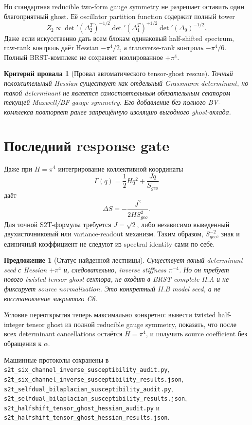 \documentclass[12pt,a4paper]{article}
\newtheorem{proposition}{Предложение}
\newtheorem{nogocriterion}{Критерий провала}
\begin{document}
Но стандартная reducible two-form gauge symmetry не разрешает оставить один
благоприятный ghost. Её oscillator partition function содержит полный tower
\begin{equation}
 Z_2\propto
 \det{}'(\Delta_2^T)^{-1/2}
 \det{}'(\Delta_1^T)^{+1/2}
 \det{}'(\Delta_0)^{-1/2}.
\end{equation}
Даже если искусственно дать всем блокам одинаковый half-shifted spectrum,
raw-rank контроль даёт Hessian $-\pi^4/2$, а transverse-rank контроль
$-\pi^4/6$. Полный BRST-комплекс не сохраняет изолированное $+\pi^4$.

\begin{nogocriterion}[Провал автоматического tensor-ghost rescue]
Точный положительный Hessian существует как отдельный Grassmann determinant,
но такой determinant не является самостоятельным обязательным сектором
текущей Maxwell/BF gauge symmetry. Его добавление без полного BV-комплекса
повторяет ранее запрещённую изоляцию выгодного ghost-вклада.
\end{nogocriterion}

\section{Последний response gate}

Даже при $H=\pi^4$ интегрирование коллективной координаты
\begin{equation}
 \Gamma(q)=\frac12Hq^2+\frac{Jq}{S_{geo}}
\end{equation}
даёт
\begin{equation}
 \Delta S=-\frac{J^2}{2HS_{geo}^2}.
\end{equation}
Для точной S2T-формулы требуется $J=\sqrt2$, либо независимо выведенный
двухисточниковый или variance-readout механизм. Таким образом, $S_{geo}^{-2}$,
знак и единичный коэффициент не следуют из spectral identity сами по себе.

\begin{proposition}[Статус найденной лестницы]
Существует явный determinant seed с Hessian $+\pi^4$ и, следовательно,
inverse stiffness $\pi^{-4}$. Но он требует нового twisted tensor-ghost
сектора, не входит в BRST-complete II.A и не фиксирует source normalization.
Это конкретный II.B model seed, а не восстановление закрытого C6.
\end{proposition}

Условие переоткрытия теперь максимально конкретно: вывести twisted
half-integer tensor ghost из полной reducible gauge symmetry, показать, что
после всех determinant cancellations остаётся $H=\pi^4$, и получить source
coefficient без обращения к $\alpha$.

Машинные протоколы сохранены в
\texttt{s2t\_six\_channel\_inverse\_susceptibility\_audit.py},
\texttt{s2t\_six\_channel\_inverse\_susceptibility\_results.json},
\texttt{s2t\_selfdual\_bilaplacian\_susceptibility\_audit.py},
\texttt{s2t\_selfdual\_bilaplacian\_susceptibility\_results.json},
\texttt{s2t\_halfshift\_tensor\_ghost\_hessian\_audit.py} и
\texttt{s2t\_halfshift\_tensor\_ghost\_hessian\_results.json}.
\end{document}
